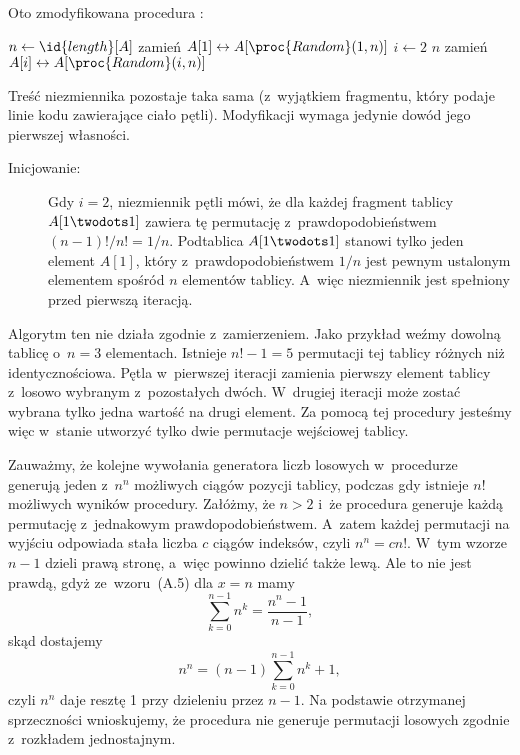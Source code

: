 
\exercise %
Oto zmodyfikowana procedura :
\begin{codebox}
\li	$n\gets\id{length}[A]$
\li	zamień $A[1]\leftrightarrow A[\proc{Random}(1,n)]$
\li	\For $i\gets2$ \To $n$
\li		\Do zamień $A[i]\leftrightarrow A[\proc{Random}(i,n)]$
		\End
\end{codebox}

Treść niezmiennika pozostaje taka sama (z~wyjątkiem fragmentu, który podaje linie kodu zawierające ciało pętli). Modyfikacji wymaga jedynie dowód jego pierwszej własności.
\begin{description}
	\item[Inicjowanie:] Gdy $i=2$, niezmiennik pętli mówi, że dla każdej  fragment tablicy $A[1\twodots1]$ zawiera tę permutację z~prawdopodobieństwem $(n-1)!/n!=1/n$. Podtablica $A[1\twodots1]$ stanowi tylko jeden element $A[1]$, który z~prawdopodobieństwem $1/n$ jest pewnym ustalonym elementem spośród $n$ elementów tablicy. A~więc niezmiennik jest spełniony przed pierwszą iteracją.
\end{description}

\exercise %

\noindent Algorytm ten nie działa zgodnie z~zamierzeniem. Jako przykład weźmy dowolną tablicę o~$n=3$ elementach. Istnieje $n!-1=5$ permutacji tej tablicy różnych niż identycznościowa. Pętla  w~pierwszej iteracji zamienia pierwszy element tablicy z~losowo wybranym z~pozostałych dwóch. W~drugiej iteracji może zostać wybrana tylko jedna wartość na drugi element. Za pomocą tej procedury jesteśmy więc w~stanie utworzyć tylko dwie permutacje wejściowej tablicy.

\exercise %
Zauważmy, że kolejne wywołania generatora liczb losowych w~procedurze  generują jeden z~$n^n$ możliwych ciągów pozycji tablicy, podczas gdy istnieje $n!$ możliwych wyników procedury. Załóżmy, że $n>2$ i~że procedura generuje każdą permutację z~jednakowym prawdopodobieństwem. A~zatem każdej permutacji na wyjściu odpowiada stała liczba $c$ ciągów indeksów, czyli $n^n=cn!$. W~tym wzorze $n-1$ dzieli prawą stronę, a~więc powinno dzielić także lewą. Ale to nie jest prawdą, gdyż ze~wzoru~(A.5) dla $x=n$ mamy
\[
    \sum_{k=0}^{n-1}n^k = \frac{n^n-1}{n-1},
\]
skąd dostajemy
\[
    n^n = (n-1)\sum_{k=0}^{n-1}n^k+1,
\]
czyli $n^n$ daje resztę 1 przy dzieleniu przez $n-1$. Na podstawie otrzymanej sprzeczności wnioskujemy, że procedura  nie generuje permutacji losowych zgodnie z~rozkładem jednostajnym.

